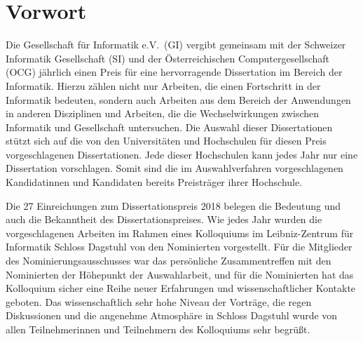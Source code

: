 \documentclass{lni}
\begin{document}




\setcounter{page}{3}
\pagestyle{fancy}
\lhead[\fancyplain{}{\small\thepage}]{\fancyplain{}}
\rhead[\fancyplain{}]{\fancyplain{}{\small\thepage}}
\cfoot{}


\section*{Vorwort}

\newcommand{\Zitat}[1]{\glqq#1\grqq}


Die Gesellschaft f{\"u}r Informatik e.V.\ (GI) vergibt gemeinsam mit der Schweizer
Informatik Gesellschaft (SI) und der {\"O}sterreichischen Computergesellschaft (OCG) j{\"a}hrlich einen Preis f{\"u}r eine
hervorragende Dissertation im Bereich der Informatik. Hierzu z{\"a}hlen nicht nur
Arbeiten, die einen Fortschritt in der Informatik bedeuten, sondern auch
Arbeiten aus dem Bereich der Anwendungen in anderen Disziplinen und Arbeiten,
die die Wechselwirkungen zwischen Informatik und Gesellschaft untersuchen. Die
Auswahl dieser Dissertationen st{\"u}tzt sich auf die von den Universit{\"a}ten und
Hochschulen f{\"u}r diesen Preis vorgeschlagenen Dissertationen. Jede dieser
Hochschulen kann jedes Jahr nur eine Dissertation vorschlagen. Somit sind die
im Auswahlverfahren vorgeschlagenen Kandidatinnen und Kandidaten bereits
\Zitat{Preistr{\"a}ger} ihrer Hochschule.

Die 27 Einreichungen zum Dissertationspreis 2018 belegen die
Bedeutung und auch die Bekanntheit des Dissertationspreises. Wie jedes
Jahr wurden die vorgeschlagenen Arbeiten im Rahmen eines Kolloquiums
im Leibniz-Zentrum f{\"u}r Informatik Schloss Dagstuhl von den Nominierten
vorgestellt. F{\"u}r die Mitglieder des Nominierungsausschusses war das
pers{\"o}nliche Zusammentreffen mit den Nominierten der H{\"o}hepunkt der
Auswahlarbeit, und f{\"u}r die Nominierten hat das Kolloquium sicher eine
Reihe neuer Erfahrungen und wissenschaftlicher Kontakte geboten. Das
wissenschaftlich sehr hohe Niveau der Vortr{\"a}ge, die regen Diskussionen
und die angenehme Atmosph{\"a}re in Schloss Dagstuhl wurde von allen
Teilnehmerinnen und Teilnehmern des Kolloquiums sehr begr{\"u}{\ss}t.
\end{document}
